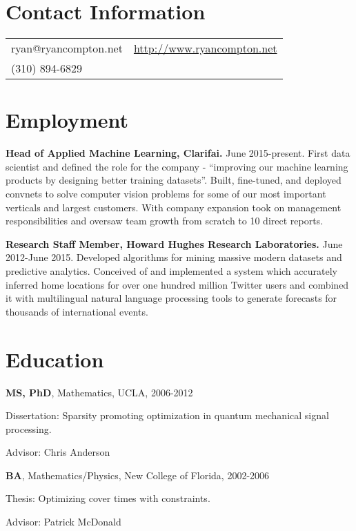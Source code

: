 \documentclass[margin,line]{res}
\newenvironment{list1}{
  \begin{list}{\ding{113}}{%
      \setlength{\itemsep}{0.0in}
      \setlength{\parsep}{0in} \setlength{\parskip}{0in}
      \setlength{\topsep}{0in} \setlength{\partopsep}{0in}
      \setlength{\leftmargin}{0.17in}}}{\end{list}}
\begin{document}

\begin{resume}
\section{\sc Contact Information}
\vspace{.05in}
\begin{tabular}{@{}p{2in}p{4in}}
    ryan@ryancompton.net   &  \url{http://www.ryancompton.net} \\
(310) 894-6829 & \\
\end{tabular}

\section{\sc Employment}
    {\bf Head of Applied Machine Learning, Clarifai.} June 2015-present. First data scientist and defined the role for the company - ``improving our machine learning products by designing better training datasets''. Built, fine-tuned, and deployed convnets to solve computer vision problems for some of our most important verticals and largest customers. With company expansion took on management responsibilities and oversaw team growth from scratch to 10 direct reports.

    {\bf Research Staff Member, Howard Hughes Research Laboratories.} June 2012-June 2015. Developed algorithms for mining massive modern datasets and predictive analytics. Conceived of and implemented a system which accurately inferred home locations for over one hundred million Twitter users and combined it with multilingual natural language processing tools to generate forecasts for thousands of international events.

\section{\sc Education}
    {\bf MS, PhD}, Mathematics, UCLA, 2006-2012\\
\vspace*{-.1in}
\begin{list1}
\item [] Dissertation: Sparsity promoting optimization in quantum mechanical signal processing.
\item [] Advisor: Chris Anderson
\end{list1}
    {\bf BA}, Mathematics/Physics, New College of Florida, 2002-2006\\
\vspace*{-.1in}
\begin{list1}
\item [] Thesis: Optimizing cover times with constraints.
\item [] Advisor: Patrick McDonald
\end{list1}


\end{resume}
\end{document}
